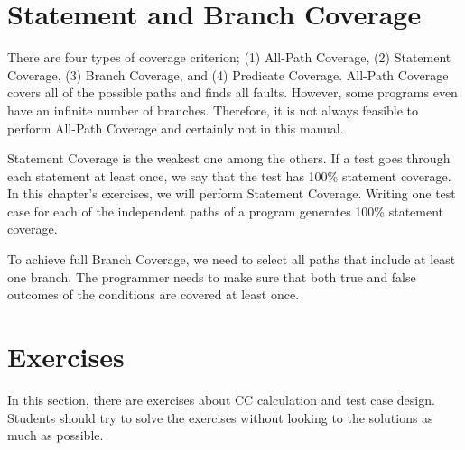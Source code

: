 \section{Statement and Branch Coverage}
There are four types of coverage criterion; (1) All-Path Coverage, (2) Statement Coverage, (3) Branch Coverage, and (4) Predicate Coverage. All-Path Coverage covers all of the possible paths and finds all faults. However, some programs even have an infinite number of branches. Therefore, it is not always feasible to perform All-Path Coverage and certainly not in this manual.

Statement Coverage is the weakest one among the others. If a test goes through each statement at least once, we say that the test has 100\% statement coverage. In this chapter's exercises, we will perform Statement Coverage. Writing one test case for each of the independent paths of a program generates 100\% statement coverage.

To achieve full Branch Coverage, we need to select all paths that include at least one branch. The programmer needs to make sure that both true and false outcomes of the conditions are covered at least once.

\section{Exercises}
In this section, there are exercises about CC calculation and test case design. Students should try to solve the exercises without looking to the solutions as much as possible.

